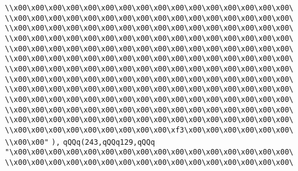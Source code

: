 \verb|\\x00\x00\x00\x00\x00\x00\x00\x00\x00\x00\x00\x00\x00\x00\x00\x00\|\newline
\verb|\\x00\x00\x00\x00\x00\x00\x00\x00\x00\x00\x00\x00\x00\x00\x00\x00\|\newline
\verb|\\x00\x00\x00\x00\x00\x00\x00\x00\x00\x00\x00\x00\x00\x00\x00\x00\|\newline
\verb|\\x00\x00\x00\x00\x00\x00\x00\x00\x00\x00\x00\x00\x00\x00\x00\x00\|\newline
\verb|\\x00\x00\x00\x00\x00\x00\x00\x00\x00\x00\x00\x00\x00\x00\x00\x00\|\newline
\verb|\\x00\x00\x00\x00\x00\x00\x00\x00\x00\x00\x00\x00\x00\x00\x00\x00\|\newline
\verb|\\x00\x00\x00\x00\x00\x00\x00\x00\x00\x00\x00\x00\x00\x00\x00\x00\|\newline
\verb|\\x00\x00\x00\x00\x00\x00\x00\x00\x00\x00\x00\x00\x00\x00\x00\x00\|\newline
\verb|\\x00\x00\x00\x00\x00\x00\x00\x00\x00\x00\x00\x00\x00\x00\x00\x00\|\newline
\verb|\\x00\x00\x00\x00\x00\x00\x00\x00\x00\x00\x00\x00\x00\x00\x00\x00\|\newline
\verb|\\x00\x00\x00\x00\x00\x00\x00\x00\x00\x00\x00\x00\x00\x00\x00\x00\|\newline
\verb|\\x00\x00\x00\x00\x00\x00\x00\x00\x00\x00\x00\x00\x00\x00\x00\x00\|\newline
\verb|\\x00\x00\x00\x00\x00\x00\x00\x00\x00\xf3\x00\x00\x00\x00\x00\x00\|\newline
\verb|\\x00\x00"|\newline
\verb|),|\newline
\verb|qQQq(243,qQQq129,qQQq|\newline
\verb|"\x00\x00\x00\x00\x00\x00\x00\x00\x00\x00\x00\x00\x00\x00\x00\x00\|\newline
\verb|\\x00\x00\x00\x00\x00\x00\x00\x00\x00\x00\x00\x00\x00\x00\x00\x00\|\newline
